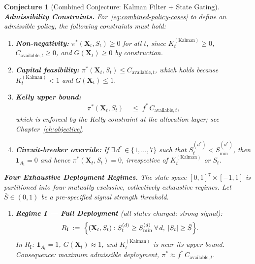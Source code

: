 \documentclass[12pt,openany]{book}
\numberwithin{equation}{chapter}
\theoremstyle{plain}
\newtheorem{conjecture}[theorem]{Conjecture}
\theoremstyle{definition}
\theoremstyle{remark}
\def\mathcal#1{#1}%
\begin{document}
\begin{conjecture}[Combined Conjecture: Kalman Filter + State Gating]
\medskip
\noindent\textbf{Admissibility Constraints.}
For~\eqref{eq:combined-policy-cases} to define an
admissible policy, the following constraints must hold:

\begin{enumerate}
  \item \textbf{Non-negativity:}
        $\pi^*(\mathbf{X}_t, S_t) \geq 0$ for all $t$,
        since $K_t^{(\mathrm{Kalman})} \geq 0$,
        $C_{\mathrm{available},t} \geq 0$, and
        $G(\mathbf{X}_t) \geq 0$ by construction.

  \item \textbf{Capital feasibility:}
        $\pi^*(\mathbf{X}_t, S_t)
         \leq C_{\mathrm{available},t}$,
        which holds because
        $K_t^{(\mathrm{Kalman})} < 1$ and
        $G(\mathbf{X}_t) \leq 1$.

  \item \textbf{Kelly upper bound:}
        \begin{align}
          \pi^*(\mathbf{X}_t, S_t)
          &\;\leq\; f^*\,C_{\mathrm{available},t},
          \label{eq:kelly-ub}
        \end{align}
        which is enforced by the Kelly constraint at the
        allocation layer; see Chapter~\ref{ch:objective}.

  \item \textbf{Circuit-breaker override:}
        If $\exists\, d^* \in \{1,\ldots,7\}$ such that
        $\mathcal{S}_t^{(d^*)} < \mathcal{S}_{\min}^{(d^*)}$,
        then $\mathbf{1}_{\mathcal{A}_t} = 0$ and hence
        $\pi^*(\mathbf{X}_t, S_t) = 0$, irrespective of
        $K_t^{(\mathrm{Kalman})}$ or $S_t$.
\end{enumerate}

\medskip
\noindent\textbf{Four Exhaustive Deployment Regimes.}
The state space $[0,1]^7 \times [-1,1]$ is partitioned into
four mutually exclusive, collectively exhaustive regimes.
Let $\bar{S} \in (0,1)$ be a pre-specified signal
strength threshold.

\begin{enumerate}
  \item \textbf{Regime I — Full Deployment}
        (all states charged; strong signal):
        \begin{align}
          \mathcal{R}_{\mathrm{I}}
          &\;:=\;
          \Bigl\{(\mathbf{X}_t, S_t) :
            \mathcal{S}_t^{(d)} \geq \mathcal{S}_{\min}^{(d)}
            \;\forall\, d,\;
            |S_t| \geq \bar{S}
          \Bigr\}.
          \label{eq:regime-I}
        \end{align}
        In $\mathcal{R}_{\mathrm{I}}$:
        $\mathbf{1}_{\mathcal{A}_t} = 1$,
        $G(\mathbf{X}_t) \approx 1$, and
        $K_t^{(\mathrm{Kalman})}$ is near its upper bound.
        Consequence: maximum admissible deployment,
        $\pi^* \approx f^*\,C_{\mathrm{available},t}$.


\end{enumerate}
\end{conjecture}
\end{document}
